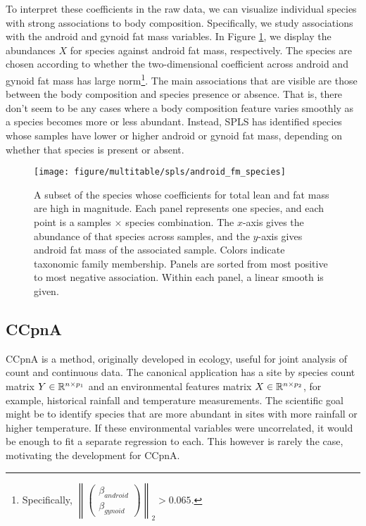 \documentclass[utf8]{frontiersFPHY} %
\begin{document}
To interpret these coefficients in the raw data, we can visualize individual
species with strong associations to body composition. Specifically, we study
associations with the android and gynoid fat mass variables. In Figure
\ref{fig:spls_android_fm_species}, we display the abundances $X$ for species
against android fat mass, respectively. The species are chosen according to
whether the two-dimensional coefficient across android and gynoid fat mass has
large norm\footnote{Specifically, $\left\| \begin{pmatrix} \beta_{android}
    \\ \beta_{gynoid} \end{pmatrix} \right\|_{2} > 0.065$.}. The main
associations that are visible are those between the body composition and species
presence or absence. That is, there don't seem to be any cases where a body
composition feature varies smoothly as a species becomes more or less abundant.
Instead, SPLS has identified species whose samples have lower or higher android
or gynoid fat mass, depending on whether that species is present or absent.

\begin{figure}
  \centering
  \texttt{[image: figure/multitable/spls/android\_fm\_species]}
  \caption{A subset of the species whose coefficients for total lean and fat
    mass are high in magnitude. Each panel represents one species, and each
    point is a samples $\times$ species combination. The $x$-axis gives the
    abundance of that species across samples, and the $y$-axis gives android fat
    mass of the associated sample. Colors indicate taxonomic family membership.
    Panels are sorted from most positive to most negative association. Within
    each panel, a linear smooth is given.
    \label{fig:spls_android_fm_species} }
\end{figure}

\subsection{CCpnA}
\label{subsec:canonical-correspondence}

CCpnA is a method, originally developed in ecology, useful for joint analysis of
count and continuous data. The canonical application has a site by species count
matrix $Y \in \mathbb{R}^{n \times p_{1}}$ and an environmental features matrix $X
\in \mathbb{R}^{n \times p_{2}}$, for example, historical rainfall and temperature
measurements. The scientific goal might be to identify species that are more
abundant in sites with more rainfall or higher temperature. If these
environmental variables were uncorrelated, it would be enough to fit a separate
regression to each. This however is rarely the case, motivating the development
for CCpnA.
\end{document}

